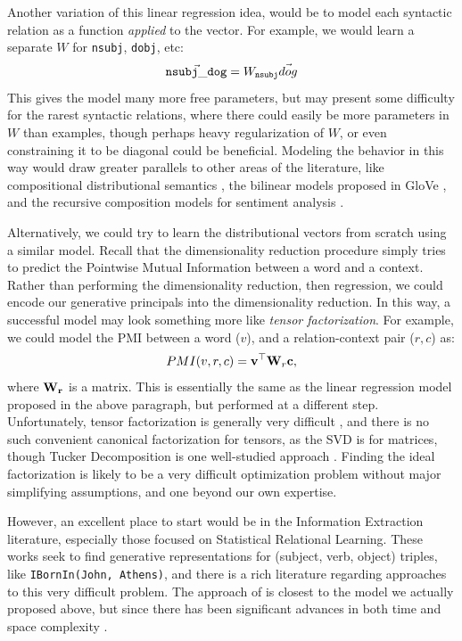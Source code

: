 \documentclass[letterpaper]{article}
\begin{document}
Another variation of this linear regression idea, would be to model each
syntactic relation as a function {\em applied} to the vector. For example,
we would learn a separate $W$ for {\tt nsubj}, {\tt dobj}, etc:
\begin{equation*}
  \vec{ {\tt nsubj\_dog} } = W_{{\tt nsubj}}\vec{dog}
\end{equation*}
This gives the model many more free parameters, but may present some difficulty
for the rarest syntactic relations, where there could easily be more parameters
in $W$ than examples, though perhaps heavy regularization of $W$, or even
constraining it to be diagonal could be beneficial. Modeling the behavior in
this way would draw greater parallels to other areas of the literature,
like compositional distributional semantics \cite{baroni:2010:emnlp,coecke:2011:la,grefenstette:2011:emnlp,baroni:2014:li}, the
bilinear models proposed in GloVe \cite{pennington:2014:emnlp}, and the recursive
composition models for sentiment analysis \cite{socher:2013:emnlp}.

Alternatively, we could  try to learn the distributional vectors from scratch
using a similar model. Recall that the dimensionality reduction procedure
simply tries to predict the Pointwise Mutual Information between a word and
a context. Rather than performing the dimensionality reduction, then regression,
we could encode our generative principals into the dimensionality reduction.
In this way, a successful model may look something more like {\em tensor
factorization}. For example, we could model the PMI between a word ($v$),
and a relation-context pair ($r, c$) as:
\begin{equation*}
  PMI(v, r, c) = {\bf v}^\top {\bf W}_{r} {\bf c},
\end{equation*}
where ${\bf W_r}$ is a matrix. This is essentially the same as the linear
regression model proposed in the above paragraph, but performed at a different
step. Unfortunately, tensor factorization is generally very difficult
\cite{haastad:1990:ja,hillar:2013:jacm}, and there is no such convenient canonical factorization for
tensors, as the SVD is for matrices, though Tucker Decomposition
is one well-studied approach \cite{tucker:1966:psy}. Finding the ideal
factorization is likely to be a very difficult optimization problem without
major simplifying assumptions, and one beyond our own expertise.

However, an excellent place to start would be in the Information Extraction
literature, especially those focused on Statistical Relational Learning. These
works seek to find generative representations for (subject, verb, object)
triples, like {\tt IBornIn(John, Athens)}, and there is a rich literature
regarding approaches to this very difficult problem.
The approach of  is closest to the model we actually
proposed above, but since there has been significant advances in both time
and space complexity
\cite{socher:2013:nips,riedel:2013:naacl,yang:2014:iclr,kuleshov:2015:aistats,trouillon:2016:icml}.
\end{document}
